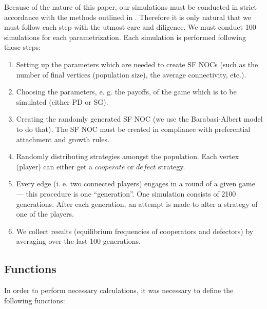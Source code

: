 \documentclass[english, twoside, 12pt, a4paper]{article}
\theoremstyle{definition}
\theoremstyle{plain}
\theoremstyle{remark}
\begin{document}
Because of the nature of this paper, our simulations must be conducted in strict accordance with the methods outlined
in \cite{santos2005scale}. Therefore it is only natural that we must follow each step with the utmost care and diligence. We must conduct 100 simulations for each parametrization. Each simulation is performed following those steps:
\begin{enumerate}[noitemsep]
  \item Setting up the parameters which are needed to create SF NOCs (such as the number of final vertices (population size), the average connectivity, etc.).
  \item Choosing the parameters, e. g. the payoffs, of the game which is to be simulated (either PD or SG).
  \item Creating the randomly generated SF NOC (we use the Barabasi-Albert model to do that). The SF NOC must be created in compliance with preferential attachment and 
  growth rules.
  \item Randomly distributing strategies amongst the population. Each vertex (player) can either get a $cooperate$ or $defect$ strategy.
  \item Every edge (i. e. two connected players) engages in a round of a given game --- this procedure is one \enquote{generation}. One simulation consists of 2100 generations. After each generation, an attempt is made to alter a strategy of one of the players.
  \item We collect results (equilibrium frequencies of cooperators and defectors) by averaging over the last 100 generations.
\end{enumerate}

\subsection{Functions}

In order to perform necessary calculations, it was necessary to define the following functions:
\end{document}
